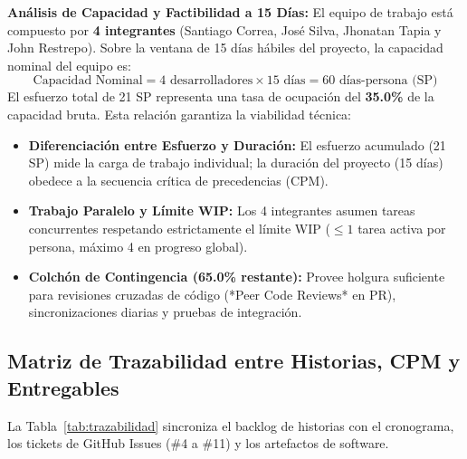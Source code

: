 \documentclass[12pt,letterpaper]{article}
\begin{document}
\textbf{Análisis de Capacidad y Factibilidad a 15 Días:}
El equipo de trabajo está compuesto por \textbf{4 integrantes} (Santiago Correa, José Silva, Jhonatan Tapia y John Restrepo). Sobre la ventana de 15 días hábiles del proyecto, la capacidad nominal del equipo es:
\begin{equation}
\text{Capacidad Nominal} = 4 \text{ desarrolladores} \times 15 \text{ días} = 60 \text{ días-persona (SP)}
\end{equation}
El esfuerzo total de 21 SP representa una tasa de ocupación del \textbf{35.0\%} de la capacidad bruta. Esta relación garantiza la viabilidad técnica:
\begin{itemize}[leftmargin=*,noitemsep]
    \item \textbf{Diferenciación entre Esfuerzo y Duración:} El esfuerzo acumulado (21 SP) mide la carga de trabajo individual; la duración del proyecto (15 días) obedece a la secuencia crítica de precedencias (CPM).
    \item \textbf{Trabajo Paralelo y Límite WIP:} Los 4 integrantes asumen tareas concurrentes respetando estrictamente el límite WIP ($\le 1$ tarea activa por persona, máximo 4 en progreso global).
    \item \textbf{Colchón de Contingencia (65.0\% restante):} Provee holgura suficiente para revisiones cruzadas de código (*Peer Code Reviews* en PR), sincronizaciones diarias y pruebas de integración.
\end{itemize}

\subsection{Matriz de Trazabilidad entre Historias, CPM y Entregables}
La Tabla~\ref{tab:trazabilidad} sincroniza el backlog de historias con el cronograma, los tickets de GitHub Issues (\#4 a \#11) y los artefactos de software.
\end{document}

